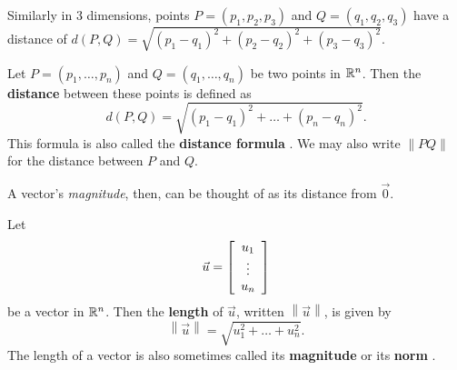 \documentclass{ximera}
\begin{document}
\begin{example}
\begin{remark}
    Similarly in 3 dimensions, points $P=(p_1,p_2,p_3)$ and
    $Q = (q_1,q_2,q_3)$ have a distance of $d(P,Q)=\sqrt{(p_1-q_1)^2+(p_2-q_2)^2+(p_3-q_3)^2}$.


  
\begin{definition}
  
      Let $P=(p_1,\ldots,p_n)$ and $Q=(q_1,\ldots,q_n)$ be two points in
      $\R^n$. Then the \textbf{distance}%
       between these points is defined as
      \begin{equation*}
        d(P, Q) = \sqrt{(p_1-q_1)^2 + \ldots + (p_n-q_n)^2}.
      \end{equation*}
      This formula is also called the \textbf{distance formula}%
      . We may also write $\left\|PQ\right\|$ for the
      distance between $P$ and $Q$.
    \end{definition}

A vector's \textit{magnitude}, then, can be thought of as its distance from $\vec{0}$. 

\begin{definition}
  Let
  \begin{equation*}
    \vec{u} = \startmat{c} u_1 \\ \vdots \\ u_n \stopmat
  \end{equation*}
  be a vector in $\R^n$. Then the \textbf{length}%
   of $\vec{u}$, written $\left\| \vec{u} \right\|$,
  is given by
  \begin{equation*}
    \left\| \vec{u} \right\| = \sqrt{u_1^2 + \ldots + u_n^2}.
  \end{equation*}
  The length of a vector is also sometimes called its
  \textbf{magnitude}%
   or its
  \textbf{norm}%
  .
\end{definition}


\end{remark}
\end{example}
\end{document}
